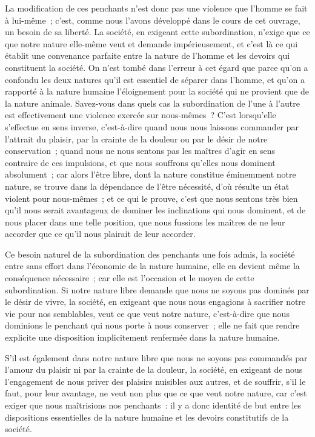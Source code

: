 \documentclass[french,twoside]{book} %
\begin{document}
La modification de ces penchants n’est donc pas une violence que l’homme se fait à lui-même ; c’est, comme nous l’avons développé dans le cours de cet ouvrage, un besoin de sa liberté. La société, en exigeant cette subordination, n’exige que ce que notre nature elle-même veut et demande impérieusement, et c’est là ce qui établit une convenance parfaite entre la nature de l’homme et les devoirs qui constituent la société. On n’est tombé dans l’erreur à cet égard que parce qu’on a confondu les deux natures qu’il est essentiel de séparer dans l’homme, et qu’on a rapporté à la nature humaine l’éloignement pour la société qui ne provient que de la nature animale. Savez-vous dans quels cas la subordination de l’une à l’autre est effectivement une violence exercée sur nous-mêmes ? C’est lorsqu’elle s’effectue en sens inverse, c’est-à-dire quand nous nous laissons commander par l’attrait du plaisir, par la crainte de la douleur ou par le désir de notre conservation ; quand nous ne nous sentons pas les maîtres d’agir en sens contraire de ces impulsions, et que nous souffrons qu’elles nous dominent absolument ; car alors l’être libre, dont la nature constitue éminemment notre nature, se trouve dans la dépendance de l’être nécessité, d’où résulte un état violent pour nous-mêmes ; et ce qui le prouve, c’est que nous sentons très bien qu’il nous serait avantageux de dominer les inclinations qui nous dominent, et de nous placer dans une telle position, que nous fussions les maîtres de ne leur accorder que ce qu’il nous plairait de leur accorder.\par
Ce besoin naturel de la subordination des penchants une fois admis, la société entre sans effort dans l’économie de la nature humaine, elle en devient même la conséquence nécessaire ; car elle est l’occasion et le moyen de cette subordination. Si notre nature libre demande que nous ne soyons pas dominés par le désir de vivre, la société, en exigeant que nous nous engagions à sacrifier notre vie pour nos semblables, veut ce que veut notre nature, c’est-à-dire que nous dominions le penchant qui nous porte à nous conserver ; elle ne fait que rendre explicite une disposition implicitement renfermée dans la nature humaine.\par
S’il est également dans notre nature libre que nous ne soyons pas commandés par l’amour du plaisir ni par la crainte de la douleur, la société, en exigeant de nous l’engagement de nous priver des plaisirs nuisibles aux autres, et de souffrir, s’il le faut, pour leur avantage, ne veut non plus que ce que veut notre nature, car c’est exiger que nous maîtrisions nos penchants : il y a donc identité de but entre les dispositions essentielles de la nature humaine et les devoirs constitutifs de la société.\par
\end{document}
